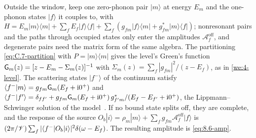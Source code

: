 Outside the window, keep one zero-phonon pair $|m\rangle$ at energy $E_m$ and the one-phonon states $|f\rangle$ it couples to, with $H = E_m|m\rangle\langle m| + \sum_fE_f|f\rangle\langle f| + \sum_f(g_{fm}|f\rangle\langle m| + g_{fm}^*|m\rangle\langle f|)$; nonresonant pairs and the paths through occupied states only enter the amplitudes $\mathcal{A}^{\mathrm{off}}_f$, and degenerate pairs need the matrix form of the same algebra. The partitioning \cref{eq:C.7-partition} with $P = |m\rangle\langle m|$ gives the level's Green's function $\mathsf{G}_m(z) = [z - E_m - \Sigma_m(z)]^{-1}$ with $\Sigma_m(z) = \sum_f|g_{fm}|^2/(z - E_f)$, as in \cref{we:4-level}. The scattering states $|f^-\rangle$ of the continuum satisfy $\langle f^-|m\rangle = g_{fm}\mathsf{G}_m(E_f + \mathrm{i}0^+)$ and $\langle f^-|f'\rangle = \delta_{ff'} + g_{fm}\mathsf{G}_m(E_f + \mathrm{i}0^+)\,g_{f'm}^*/(E_f - E_{f'} + \mathrm{i}0^+)$, the Lippmann--Schwinger solution of the model~\cite{fano1961effects}. If no bound state splits off, they are complete, and the response of the source $O_b|i\rangle = \rho_m|m\rangle + \sum_fg_{fm}\mathcal{A}^{\mathrm{off}}_f|f\rangle$ is $(2\pi/\mathscr{V})\sum_f|\langle f^-|O_b|i\rangle|^2\delta(\omega - E_f)$. The resulting amplitude is \cref{eq:8.6-amp}.

